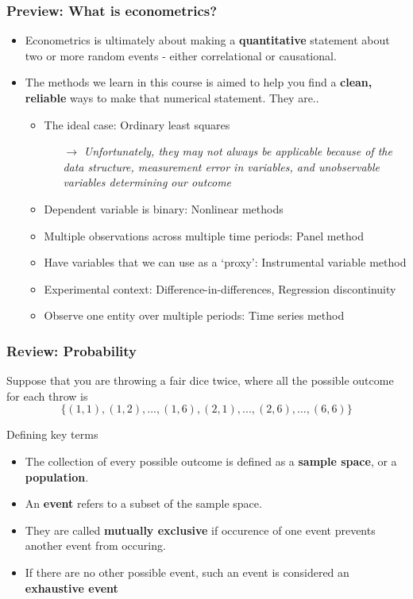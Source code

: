 \documentclass[compress]{beamer}
\newenvironment{wideitemize}{\itemize\addtolength{\itemsep}{10pt}}{\enditemize}
\begin{document}
\begin{frame}
\frametitle{Preview: What is econometrics?}
\begin{itemize}
\item Econometrics is ultimately about making a \textbf{quantitative} statement about two or more random events - either correlational or causational. 
\item The methods we learn in this course is aimed to help you find a \textbf{clean, reliable} ways to make that numerical statement. They are..
\begin{itemize}
\item The ideal case: Ordinary least squares
\begin{itemize}
\item[$\to$]  \textit{Unfortunately, they may not always be applicable because of the data structure, measurement error in variables, and unobservable variables determining our outcome}
\end{itemize}
\item Dependent variable is binary: Nonlinear methods
\item Multiple observations across multiple time periods: Panel method
\item Have variables that we can use as a `proxy': Instrumental variable method
\item Experimental context: Difference-in-differences, Regression discontinuity
\item Observe one entity over multiple periods: Time series method
\end{itemize}
  
\end{itemize}
\end{frame}

\begin{frame}
\frametitle{Review: Probability}
\begin{wideitemize}
\item  Suppose that you are throwing a fair dice twice, where all the possible outcome for each throw is
\[
\{(1,1),(1,2),...,(1,6),(2,1),...,(2,6),...,(6,6)\}
\]
\item Defining key terms
\begin{itemize}
\item The collection of every possible outcome is defined as a \textbf{sample space}, or a \textbf{population}.
\item An \textbf{event} refers to a subset of the sample space. 
\item  They are called \textbf{mutually exclusive} if occurence of one event prevents another event from occuring.
\item If there are no other possible event, such an event is considered an \textbf{exhaustive event}
\end{itemize}
\end{wideitemize}
\end{frame}
\end{document}
